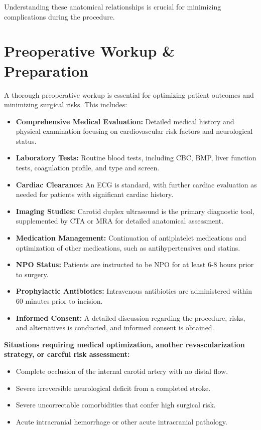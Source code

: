 Understanding these anatomical relationships is crucial for minimizing complications during the procedure.

\section*{Preoperative Workup \& Preparation}
A thorough preoperative workup is essential for optimizing patient outcomes and minimizing surgical risks. This includes:

\begin{itemize}
  \item \textbf{Comprehensive Medical Evaluation:} Detailed medical history and physical examination focusing on cardiovascular risk factors and neurological status.

  \item \textbf{Laboratory Tests:} Routine blood tests, including CBC, BMP, liver function tests, coagulation profile, and type and screen.

  \item \textbf{Cardiac Clearance:} An ECG is standard, with further cardiac evaluation as needed for patients with significant cardiac history.

  \item \textbf{Imaging Studies:} Carotid duplex ultrasound is the primary diagnostic tool, supplemented by CTA or MRA for detailed anatomical assessment.

  \item \textbf{Medication Management:} Continuation of antiplatelet medications and optimization of other medications, such as antihypertensives and statins.

  \item \textbf{NPO Status:} Patients are instructed to be NPO for at least 6-8 hours prior to surgery.

  \item \textbf{Prophylactic Antibiotics:} Intravenous antibiotics are administered within 60 minutes prior to incision.

  \item \textbf{Informed Consent:} A detailed discussion regarding the procedure, risks, and alternatives is conducted, and informed consent is obtained.
\end{itemize}

\textbf{Situations requiring medical optimization, another revascularization strategy, or careful risk assessment:}
\begin{itemize}
  \item Complete occlusion of the internal carotid artery with no distal flow.
  \item Severe irreversible neurological deficit from a completed stroke.
  \item Severe uncorrectable comorbidities that confer high surgical risk.
  \item Acute intracranial hemorrhage or other acute intracranial pathology.
\end{itemize}

